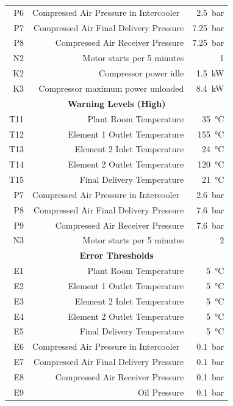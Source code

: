 \begin{table}[htbp]
\begin{tabular}{rrr}
    P6    & Compressed Air Pressure in Intercooler  & \SI{2.5}{\bar} \\
    P7    & Compressed Air Final Delivery Pressure & \SI{7.25}{\bar} \\
    P8    & Compressed Air Receiver Pressure & \SI{7.25}{\bar}\\
    N2    & Motor starts per 5 minutes & 1 \\
    K2    & Compressor power idle & \SI{1.5}{\kilo \watt} \\
    K3    & Compressor maximum power unloaded & \SI{8.4}{\kilo \watt} \\
    \multicolumn{3}{c}{\textbf{Warning Levels (High)}} \\
    T11   & Plant Room Temperature & \SI{35}{\degreeCelsius} \\
    T12   & Element 1 Outlet Temperature & \SI{155}{\degreeCelsius} \\
    T13   & Element 2 Inlet Temperature & \SI{24}{\degreeCelsius} \\
    T14   & Element 2 Outlet Temperature & \SI{120}{\degreeCelsius} \\
    T15   & Final Delivery Temperature & \SI{21}{\degreeCelsius} \\
    P7    & Compressed Air Pressure in Intercooler  & \SI{2.6}{\bar} \\
    P8    & Compressed Air Final Delivery Pressure & \SI{7.6}{\bar} \\
    P9    & Compressed Air Receiver Pressure & \SI{7.6}{\bar} \\
    N3    & Motor starts per 5 minutes & 2 \\
    \multicolumn{3}{c}{\textbf{Error Thresholds}} \\
    E1    & Plant Room Temperature & \SI{5}{\degreeCelsius} \\
    E2    & Element 1 Outlet Temperature & \SI{5}{\degreeCelsius} \\
    E3    & Element 2 Inlet Temperature & \SI{5}{\degreeCelsius} \\
    E4    & Element 2 Outlet Temperature & \SI{5}{\degreeCelsius} \\
    E5    & Final Delivery Temperature & \SI{5}{\degreeCelsius} \\
    E6    & Compressed Air Pressure in Intercooler  & \SI{0.1}{\bar} \\
    E7    & Compressed Air Final Delivery Pressure & \SI{0.1}{\bar} \\
    E8    & Compressed Air Receiver Pressure & \SI{0.1}{\bar} \\
    E9    & Oil Pressure & \SI{0.1}{\bar} \\
    \bottomrule
    \end{tabular}%
  \label{tab:nomenclature}%
\end{table}%



